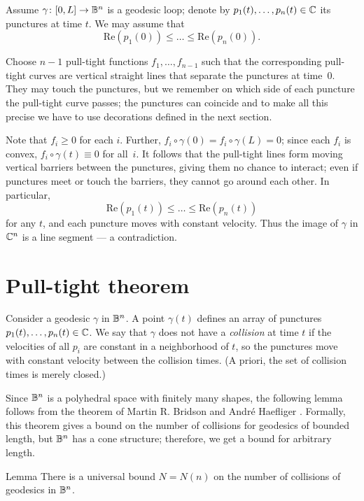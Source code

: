 \documentclass[a4paper,10pt]{article}
\begin{document}
Assume $\gamma\colon[0,L]\to\mathbb{B}^n$ is a geodesic loop;
denote by $p_1(t),\z\ldots,p_n(t)\in\CC$ its punctures at time $t$.
We may assume that
\[\mathrm{Re}(p_1(0))\le\ldots\le \mathrm{Re}(p_n(0)).\]

Choose $n-1$ pull-tight functions $f_1,\ldots,f_{n-1}$
such that the corresponding pull-tight curves are vertical straight lines that separate the punctures at time~$0$.
They may touch the punctures, but we remember on which side of each puncture the pull-tight curve passes;
the punctures can coincide and to make all this precise we have to use decorations defined in the next section.

Note that $f_i\ge0$ for each $i$.
Further, $f_i\circ\gamma(0)=f_i\circ\gamma(L)=0$;
since each $f_i$ is convex, $f_i\circ\gamma(t)\equiv 0$ for all~$i$.
It follows that the pull-tight lines form moving vertical barriers between the punctures, giving them no chance to interact; even if punctures meet or touch the barriers, they cannot go around each other.
In particular,
\[\mathrm{Re}(p_1(t))\le\ldots\le \mathrm{Re}(p_n(t))\]
for any $t$, and each puncture moves with constant velocity.
Thus the image of $\gamma$ in $\mathbb{C}^n$ is a line segment --- a contradiction.
\qeds

\section{Pull-tight theorem}\label{sec:pull-tight}

Consider a geodesic $\gamma$ in $\mathbb{B}^n$.
A point $\gamma(t)$ defines an array of punctures $p_1(t),\z\ldots,p_n(t)\in\CC$.
We say that $\gamma$ does not have a \emph{collision} at time $t$ if the velocities of all $p_i$ are constant in a neighborhood of $t$,
so the punctures move with constant velocity between the collision times.
(A priori, the set of collision times is merely closed.)

Since $\mathbb{B}^n$ is a polyhedral space with finitely many shapes, the following lemma follows from the theorem of Martin R. Bridson and André Haefliger \cite[I.7.28]{bridson-haefliger}.
Formally, this theorem gives a bound on the number of collisions for geodesics of bounded length, but $\mathbb{B}^n$ has a cone structure; therefore, we get a bound for arbitrary length.

\begin{thm}{Lemma}\label{lem:BFK}
There is a universal bound $N=N(n)$ on the number of collisions of geodesics in $\mathbb{B}^n$.
\end{thm}
\end{document}
